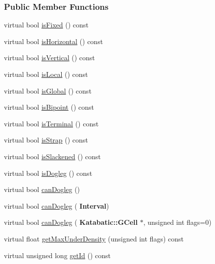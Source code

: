 \subsubsection*{Public Member Functions}
\begin{DoxyCompactItemize}
\item 
virtual bool \hyperlink{classKite_1_1TrackSegment_afd7362b850709bed8b61c1aa22399f97}{is\+Fixed} () const
\item 
virtual bool \hyperlink{classKite_1_1TrackSegment_a21b9cefd33ae22e4c2070ad441bdd30b}{is\+Horizontal} () const
\item 
virtual bool \hyperlink{classKite_1_1TrackSegment_abd54544ef1710ee4b67cfb021d73446c}{is\+Vertical} () const
\item 
virtual bool \hyperlink{classKite_1_1TrackSegment_add556a145a89fdbcea82346abfb873dc}{is\+Local} () const
\item 
virtual bool \hyperlink{classKite_1_1TrackSegment_a19ba379112d6b29faa45c5eefbf38500}{is\+Global} () const
\item 
virtual bool \hyperlink{classKite_1_1TrackSegment_a72741158d19af38e84c5e9c08f91270f}{is\+Bipoint} () const
\item 
virtual bool \hyperlink{classKite_1_1TrackSegment_a1e074cb3064037035548e5e6d238e315}{is\+Terminal} () const
\item 
virtual bool \hyperlink{classKite_1_1TrackSegment_a62d61c231cf404a814ae37665fa8164f}{is\+Strap} () const
\item 
virtual bool \hyperlink{classKite_1_1TrackSegment_a782cff57d3fe10e758d19ee65a06643d}{is\+Slackened} () const
\item 
virtual bool \hyperlink{classKite_1_1TrackSegment_a75d91371e5281dd21f60ff39ae70a3e5}{is\+Dogleg} () const
\item 
virtual bool \hyperlink{classKite_1_1TrackSegment_aa0bb6f1592688e942ff67e0ac318a4fd}{can\+Dogleg} ()
\item 
virtual bool \hyperlink{classKite_1_1TrackSegment_accb4c6a7ee2678a0cff4dbc4a7860fe1}{can\+Dogleg} (\textbf{ Interval})
\item 
virtual bool \hyperlink{classKite_1_1TrackSegment_a4f040cf33009e4886d401115c3bea838}{can\+Dogleg} (\textbf{ Katabatic\+::\+G\+Cell} $\ast$, unsigned int flags=0)
\item 
virtual float \hyperlink{classKite_1_1TrackSegment_abb61228ad7b29c19c6428902d34126f7}{get\+Max\+Under\+Density} (unsigned int flags) const
\item 
virtual unsigned long \hyperlink{classKite_1_1TrackSegment_afdedcef127ad2a3677a5b48d7d3453f3}{get\+Id} () const

\end{DoxyCompactItemize}
